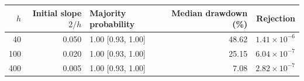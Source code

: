 \begin{center}
\begin{minipage}{\linewidth}\centering
\captionsetup{type=table,hypcap=false}
\caption{Additional dealer-depth comparisons at fraction $f=0.20$ with active technical traders and 50 starting markets over 3,000 post-switch steps. Because the dealer's cash and share reserves keep a constant product, the initial slope of the log quoted price against net purchases per trader is approximately $2/h$; the model has no separate price-impact coefficient. Depth changes funding and price sensitivity together. Drawdown is a percentage, and the dealer-rejection fraction uses post-switch eligible orders. Probability brackets are 95\% Wilson intervals.}
\label{tab:revision-impact}
\small
\begin{tabular}{rrlrr}
\toprule
$h$ & Initial slope $2/h$ & Majority probability & Median drawdown (\%) & Rejection \\
\midrule
40 & 0.050 & 1.00 [0.93, 1.00] & 48.62 & $1.41\times10^{-6}$ \\
100 & 0.020 & 1.00 [0.93, 1.00] & 25.15 & $6.04\times10^{-7}$ \\
400 & 0.005 & 1.00 [0.93, 1.00] & 7.08 & $2.82\times10^{-7}$ \\
\bottomrule
\end{tabular}
\end{minipage}
\end{center}


